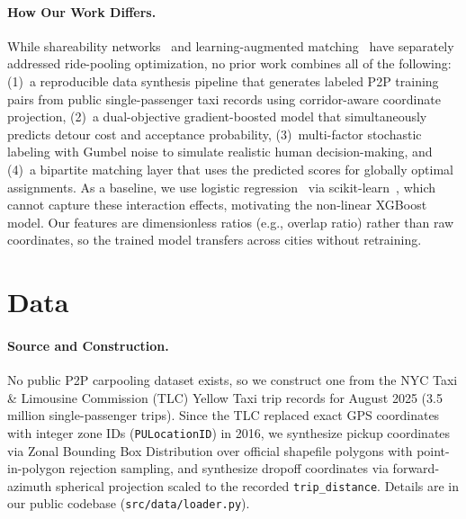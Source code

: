 \documentclass{article}
\begin{document}
\paragraph{How Our Work Differs.}
While shareability networks~\citep{santi2014quantifying} and learning-augmented matching~\citep{bjorck2021learning} have separately addressed ride-pooling optimization, no prior work combines all of the following: (1)~a reproducible data synthesis pipeline that generates labeled P2P training pairs from public single-passenger taxi records using corridor-aware coordinate projection, (2)~a dual-objective gradient-boosted model that simultaneously predicts detour cost and acceptance probability, (3)~multi-factor stochastic labeling with Gumbel noise to simulate realistic human decision-making, and (4)~a bipartite matching layer that uses the predicted scores for globally optimal assignments. As a baseline, we use logistic regression~\citep{cox1958regression} via scikit-learn~\citep{pedregosa2011scikit}, which cannot capture these interaction effects, motivating the non-linear XGBoost model. Our features are dimensionless ratios (e.g., overlap ratio) rather than raw coordinates, so the trained model transfers across cities without retraining.


\section{Data}
\label{sec:data}

\paragraph{Source and Construction.}
No public P2P carpooling dataset exists, so we construct one from the NYC Taxi \& Limousine Commission (TLC) Yellow Taxi trip records for August 2025 (3.5 million single-passenger trips). Since the TLC replaced exact GPS coordinates with integer zone IDs (\texttt{PULocationID}) in 2016, we synthesize pickup coordinates via Zonal Bounding Box Distribution over official shapefile polygons with point-in-polygon rejection sampling, and synthesize dropoff coordinates via forward-azimuth spherical projection scaled to the recorded \texttt{trip\_distance}. Details are in our public codebase (\texttt{src/data/loader.py}).
\end{document}
